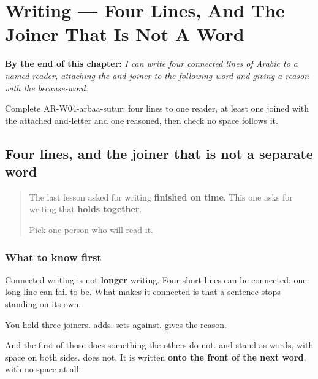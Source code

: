 
\chapter{Writing --- Four Lines, And The Joiner That Is Not A Word}
\label{ch:ar-arbaa-sutur}

\begin{chapteropening}
\textbf{By the end of this chapter:} \emph{I can write four connected lines of Arabic to a named reader, attaching the and-joiner to the following word and giving a reason with the because-word.}

Complete AR-W04-arbaa-sutur: four lines to one reader, at least one joined with the attached and-letter and one reasoned, then check no space follows it.
\end{chapteropening}

\section[\texorpdfstring{\ar{و} (wa)}{و (wa)}]{Four lines, and the joiner that is not a separate word}

\label{lesson:AR-W04-arbaa-sutur}



\begin{quote}
The last lesson asked for writing \textbf{finished on time}. This one asks for writing that \textbf{holds together}.

Pick one person who will read it.
\end{quote}

\subsection*{What to know first}
Connected writing is not \textbf{longer} writing. Four short lines can be connected; one long line can fail to be. What makes it connected is that a sentence stops standing on its own.

You hold three joiners. \textbf{} adds. \textbf{} sets against. \textbf{} gives the reason.

And the first of those does something the others do not. \textbf{} and \textbf{} stand as words, with space on both sides. \textbf{} does not. It is written \textbf{onto the front of the next word}, with no space at all.

